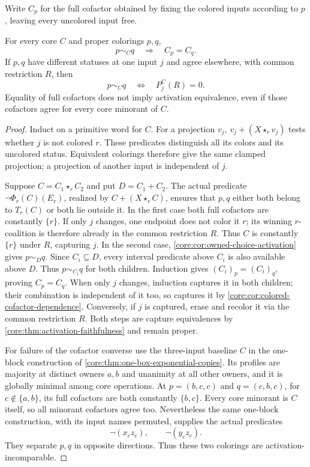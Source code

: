 Write $C_p$ for the full cofactor obtained by fixing the colored inputs
according to $p$, leaving every uncolored input free.

\begin{proposition}
\label{core:prop:activation-cofactor-invariance}
For every core $C$ and proper colorings $p,q$,
\[
 p\sim_Cq\quad\Longrightarrow\quad C_p=C_q.
\]
If $p,q$ have different statuses at one input $j$ and agree elsewhere,
with common restriction $R$, then
\[
 p\sim_Cq\quad\Longleftrightarrow\quad P_j^C(R)=0.
\]
Equality of full cofactors does not imply activation equivalence,
even if those cofactors agree for every core minorant of $C$.
\end{proposition}
\begin{proof}
Induct on a primitive word for $C$. For a projection $v_j$,
$v_j+(X\star_r v_j)$ tests whether $j$ is not colored $r$.
These predicates distinguish all its colors and its uncolored status.
Equivalent colorings therefore give the same clamped projection;
a projection of another input is independent of $j$.

Suppose $C=C_1\star_r C_2$ and put $D=C_1+C_2$.
The actual predicate $\neg\Phi_r(C)(E_r)$, realized by
$C+(X\star_r C)$, ensures that $p,q$ either both belong to $T_r(C)$
or both lie outside it. In the first case both full cofactors are
constantly $\{r\}$. If only $j$ changes, one endpoint does not
color it $r$; its winning $r$-coalition is therefore already in
the common restriction $R$. Thus $C$ is constantly $\{r\}$ under
$R$, capturing $j$. In the second case,
\cref{core:cor:owned-choice-activation} gives $p\sim_Dq$.
Since $C_i\subseteq D$, every interval predicate above $C_i$ is also
available above $D$. Thus $p\sim_{C_i}q$ for both children.
Induction gives $(C_i)_p=(C_i)_q$, proving $C_p=C_q$.
When only $j$ changes, induction captures it in both children;
their combination is independent of it too, so captures it by
\cref{core:cor:colored-cofactor-dependence}.
Conversely, if $j$ is captured, erase and recolor it via the common
restriction $R$. Both steps are capture equivalences by
\cref{core:thm:activation-faithfulness} and remain proper.

For failure of the cofactor converse use the three-input baseline $C$ in the one-block
construction of \cref{core:thm:one-box-exponential-copies}. Its profiles
are majority at distinct owners $a,b$ and unanimity at all other owners,
and it is globally minimal among core operations. At
$p=(b,c,c)$ and $q=(c,b,c)$, for $c\notin\{a,b\}$, its full
cofactors are both constantly $\{b,c\}$. Every core minorant is $C$
itself, so all minorant cofactors agree too. Nevertheless the same
one-block construction, with its input names permuted, supplies the
actual predicates
\[
 \neg(x_cz_c),\qquad \neg(y_cz_c).
\]
They separate $p,q$ in opposite directions. Thus these two colorings
are activation-incomparable.
\end{proof}

